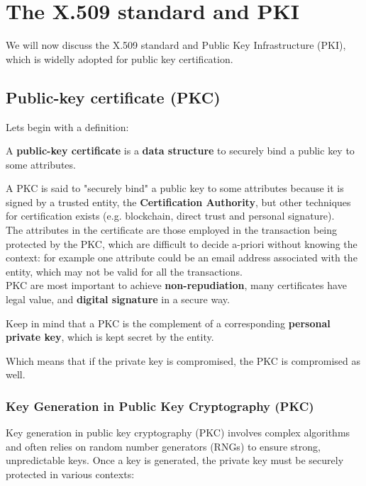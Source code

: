 \chapter{The X.509 standard and PKI}
We will now discuss the X.509 standard and Public Key Infrastructure 
(PKI), which is widelly adopted for public key certification.
\section{Public-key certificate (PKC)}
Lets begin with a definition:
\begin{boxH}
  A \textbf{public-key certificate} is a \textbf{data structure} to securely
  bind a public key to some attributes.
\end{boxH}
A PKC is said to "securely bind" a public key to some attributes
because it is signed by a trusted entity, the \textbf{Certification
Authority}, but other techniques for certification exists (e.g.
blockchain, direct trust and personal signature).\\
The attributes in the certificate are those employed in the
transaction being protected by the PKC, which are difficult to decide
a-priori without knowing the context: for example one attribute could
be an email address associated with the entity, which may not be valid
for all the transactions.\\
PKC are most important to achieve \textbf{non-repudiation}, many
certificates have legal value, and \textbf{digital signature} in a
secure way.\\
\begin{boxH}
  Keep in mind that a PKC is the complement of a corresponding
  \textbf{personal private key}, which is kept secret by the entity.
\end{boxH}
Which means that if the private key is compromised, the PKC is 
compromised as well.
\subsection{Key Generation in Public Key Cryptography (PKC)}

Key generation in public key cryptography (PKC) involves complex
algorithms and often relies on random number generators (RNGs) to
ensure strong, unpredictable keys. Once a key is generated, the
private key must be securely protected in various contexts:

